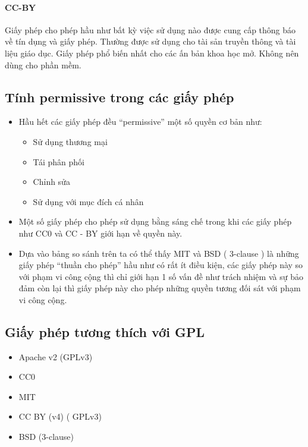 \documentclass[12pt]{article}
\begin{document}
\paragraph{CC-BY}
Giấy phép cho phép hầu như bất kỳ việc sử dụng nào được cung cấp thông báo về tín dụng và giấy phép. Thường được sử dụng cho tài sản truyền thông và tài liệu giáo dục. Giấy phép phổ biến nhất cho các ấn bản khoa học mở. Không nên dùng cho phần mềm.



\subsection{Tính permissive trong các giấy phép}
\begin{itemize}
\item Hầu hết các giấy phép đều “permissive” một số quyền cơ bản như:
\begin{itemize}
\item Sử dụng thương mại 
\item Tái phân phối
\item Chỉnh sửa 
\item Sử dụng với mục đích cá nhân
\end{itemize}
\item Một số giấy phép cho phép sử dụng bằng sáng chế trong khi các giấy phép như CC0 và CC - BY giới hạn về quyền này.
\item Dựa vào bảng so sánh trên ta có thể thấy MIT và BSD ( 3-clause ) là những giấy phép “thuần cho phép” hầu như có rất ít điều kiện, các giấy phép này so với phạm vi công cộng thì chỉ giới hạn 1 số vấn đề như trách nhiệm và sự bảo đảm còn lại thì giấy phép này cho phép những quyền tương đối sát với phạm vi công cộng.
\end{itemize}

\subsection{Giấy phép tương thích với GPL}
\begin{itemize}
\item Apache v2 (GPLv3)
\item CC0 
\item MIT 
\item CC BY (v4) ( GPLv3)
\item BSD (3-clause) 
\end{itemize}
\end{document}
